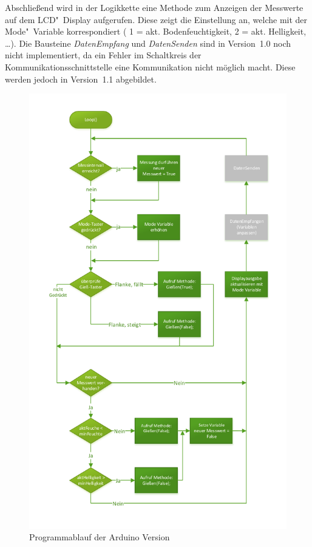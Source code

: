 Abschließend wird in der Logikkette eine Methode zum Anzeigen der Messwerte auf dem LCD"~Display aufgerufen. Diese zeigt die Einstellung an, welche mit der Mode"~Variable korrespondiert ( 1 = akt. Bodenfeuchtigkeit, 2 = akt.  Helligkeit, \dots). Die Bausteine \emph{DatenEmpfang} und \emph{DatenSenden} sind in Version~1.0 noch nicht implementiert, da ein Fehler im Schaltkreis der Kommunikationsschnittstelle eine Kommunikation nicht möglich macht. Diese werden jedoch in Version~1.1 abgebildet.

\begin{figure}[h]
	\centering
	\includegraphics[width=\linewidth]{diagramme/AV_Ablaufdiagramm.pdf}
	\caption{Programmablauf der Arduino Version}
	\label{fig-AV_Ablaufplan}
\end{figure}
	
